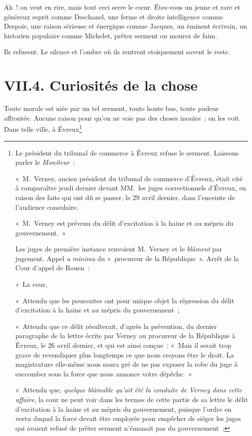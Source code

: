 \documentclass[french,twoside]{book} %
\begin{document}
Ah ! on veut en rire, mais tout ceci serre le cœur. Êtes-vous un jeune et rare et généreux esprit comme Deschanel, une ferme et droite intelligence comme Despois, une raison sérieuse et énergique comme Jacques, un éminent écrivain, un historien populaire comme Michelet, prêtez serment ou mourez de faim.\par
Ils refusent. Le silence et l’ombre où ils rentrent stoïquement savent le reste.

\section[{VII.4. Curiosités de la chose}]{VII.4. Curiosités de la chose}

\noindent Toute morale est niée par un tel serment, toute honte bue, toute pudeur affrontée. Aucune raison pour qu’on ne voie pas des choses inouïes ; on les voit. Dans telle ville, à Évreux\footnote{ \noindent Le président du tribunal de commerce à Évreux refuse le serment. Laissons parler le \emph{Moniteur} :\par
 « M. Verney, ancien président du tribunal de commerce d’Évreux, était cité à comparaître jeudi dernier devant MM. les juges correctionnels d’Évreux, en raison des faits qui ont dû se passer, le 29 avril dernier, dans l’enceinte de l’audience consulaire.\par
 « M. Verney est prévenu du délit d’excitation à la haine et au mépris du gouvernement. »\par
 Les juges de première instance renvoient M. Verney et le \emph{blâment} par jugement. Appel \emph{a minima} du « procureur de la République ». Arrêt de la Cour d’appel de Rouen :\par
 « La cour,\par
 « Attendu que les poursuites ont pour unique objet la répression du délit d’excitation à la haine et au mépris du gouvernement ;\par
 « Attendu que ce délit résulterait, d’après la prévention, du dernier paragraphe de la lettre écrite par Verney au procureur de la République à Évreux, le 26 avril dernier, et qui est ainsi conçue : « Mais il serait trop grave de revendiquer plus longtemps ce que nous croyons être le droit. La magistrature elle-même nous saura gré de ne pas exposer la robe du juge à succomber sous la force que nous annonce votre dépêche. »\par
 « Attendu que, \emph{quelque blâmable qu’ait été la conduite de Verney dans cette affaire}, la cour ne peut voir dans les termes de cette partie de sa lettre le délit d’excitation à la haine et au mépris du gouvernement, puisque l’ordre en vertu duquel la force devait être employée pour empêcher de siéger les juges qui avaient refusé de prêter serment n’émanait pas du gouvernement ;\par
}
\end{document}
